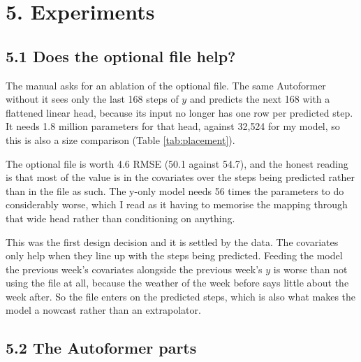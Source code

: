 \documentclass[11pt,letterpaper]{article}
\begin{document}
\section*{5. Experiments}

\subsection*{5.1 Does the optional file help?}

The manual asks for an ablation of the optional file. The same Autoformer without it sees only the last 168 steps of $y$ and predicts the next 168 with a flattened linear head, because its input no longer has one row per predicted step. It needs 1.8 million parameters for that head, against 32{,}524 for my model, so this is also a size comparison (Table \ref{tab:placement}).

\begin{table}[H]
\centering
\small

\caption{Optional file ablation. Same five folds, 3 seeds, identical blocks and training schedule. The only difference is what the model is allowed to see.}
\label{tab:placement}
\end{table}

The optional file is worth 4.6 RMSE (50.1 against 54.7), and the honest reading is that most of the value is in the covariates over the steps being predicted rather than in the file as such. The y-only model needs {56 times} the parameters to do considerably worse, which I read as it having to memorise the mapping through that wide head rather than conditioning on anything.

This was the first design decision and it is settled by the data. The covariates only help when they line up with the steps being predicted. Feeding the model the previous week's covariates alongside the previous week's $y$ is {worse} than not using the file at all, because the weather of the week before says little about the week after. So the file enters on the predicted steps, which is also what makes the model a nowcast rather than an extrapolator.

\subsection*{5.2 The Autoformer parts}

\begin{table}[H]
\centering
\small

\caption{Changes to the final configuration, one at a time, 5 folds x 3 seeds. All of them are worse or neutral, which is the point of the table.}
\label{tab:parts}
\end{table}
\end{document}
